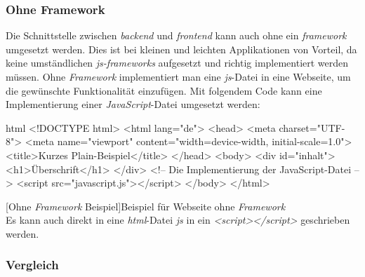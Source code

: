 \subsubsection{Ohne Framework}
Die Schnittstelle zwischen \textit{\Gls{backend}} und \textit{\Gls{frontend}} kann auch ohne ein \textit{\Gls{framework}} umgesetzt werden. Dies ist bei kleinen und leichten Applikationen von Vorteil, da keine umständlichen \textit{\Gls{js}-\Gls{framework}s} aufgesetzt und richtig implementiert werden müssen. Ohne \textit{Framework} implementiert man eine \textit{\Gls{js}}-Datei in eine Webseite, um die gewünschte Funktionalität einzufügen. Mit folgendem Code kann eine Implementierung einer \textit{JavaScript}-Datei umgesetzt werden:
\begin{code}{html}
	<!DOCTYPE html>
	<html lang="de">
		<head>
			<meta charset="UTF-8">
			<meta name="viewport" content="width=device-width, initial-scale=1.0">
			<title>Kurzes Plain-Beispiel</title>
		</head>
		<body>
			<div id="inhalt">
				<h1>Überschrift</h1>
			</div>
			<!-- Die Implementierung der JavaScript-Datei -->
			<script src="javascript.js"></script>
		</body>
	</html>
\end{code}
[Ohne \textit{Framework} Beispiel]{Beispiel für Webseite ohne \textit{Framework}}~\\
Es kann auch direkt in eine \textit{\Gls{html}}-Datei \textit{\Gls{js}} in ein \textit{<script></script>} geschrieben werden.
\newpage
\subsubsection{Vergleich}

